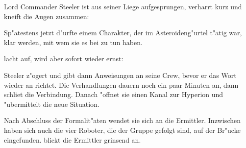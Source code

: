 
Lord Commander Steeler ist aus seiner Liege aufgesprungen, verharrt kurz und kneift die Augen zusammen:


Sp"atestens jetzt d"urfte einem Charakter, der im Asteroideng"urtel t"atig war, klar werden, mit wem sie es bei \xl{} zu tun haben.

\xl{} lacht auf, wird aber sofort wieder ernst:


Steeler z"ogert und gibt dann Anweisungen an seine Crew, bevor er das Wort wieder an \xl{} richtet. Die Verhandlungen dauern noch ein paar Minuten an, dann schlie\3t \xl{} die Verbindung. Danach "offnet sie einen Kanal zur Hyperion und "ubermittelt die neue Situation.

Nach Abschluss der Formalit"aten wendet sie sich an die Ermittler. Inzwischen haben sich auch die vier Roboter, die der Gruppe gefolgt sind, auf der Br"ucke eingefunden. \xl{} blickt die Ermittler grinsend an.


